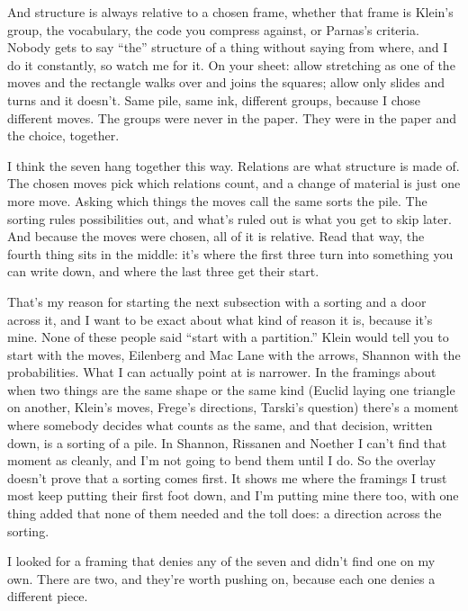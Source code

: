 \documentclass[11pt,twoside]{article}
\theoremstyle{thielethm}
\theoremstyle{thieledef}
\theoremstyle{thieledef}
\theoremstyle{thieledef}
\theoremstyle{thielethm}
\theoremstyle{thieleobs}
\theoremstyle{thielethm}
\begin{document}
And structure is always relative to a chosen frame, whether that frame is Klein's group, the vocabulary, the code you compress against, or Parnas's criteria. Nobody gets to say ``the'' structure of a thing without saying from where, and I do it constantly, so watch me for it. On your sheet: allow stretching as one of the moves and the rectangle walks over and joins the squares; allow only slides and turns and it doesn't. Same pile, same ink, different groups, because I chose different moves. The groups were never in the paper. They were in the paper and the choice, together.

I think the seven hang together this way. Relations are what structure is made of. The chosen moves pick which relations count, and a change of material is just one more move. Asking which things the moves call the same sorts the pile. The sorting rules possibilities out, and what's ruled out is what you get to skip later. And because the moves were chosen, all of it is relative. Read that way, the fourth thing sits in the middle: it's where the first three turn into something you can write down, and where the last three get their start.

That's my reason for starting the next subsection with a sorting and a door across it, and I want to be exact about what kind of reason it is, because it's mine. None of these people said ``start with a partition.'' Klein would tell you to start with the moves, Eilenberg and Mac Lane with the arrows, Shannon with the probabilities. What I can actually point at is narrower. In the framings about when two things are the same shape or the same kind (Euclid laying one triangle on another, Klein's moves, Frege's directions, Tarski's question) there's a moment where somebody decides what counts as the same, and that decision, written down, is a sorting of a pile. In Shannon, Rissanen and Noether I can't find that moment as cleanly, and I'm not going to bend them until I do. So the overlay doesn't prove that a sorting comes first. It shows me where the framings I trust most keep putting their first foot down, and I'm putting mine there too, with one thing added that none of them needed and the toll does: a direction across the sorting.

I looked for a framing that denies any of the seven and didn't find one on my own. There are two, and they're worth pushing on, because each one denies a different piece.
\end{document}
